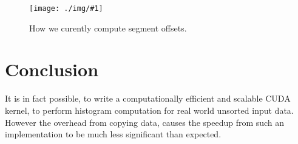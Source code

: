 \documentclass[12pt, a4paper, hidelinks]{article}
\newcommand{\fig}[3]{
\begin{figure}[h]
  \begin{center}
    \texttt{[image: ./img/\#1]}
  \end{center}
  \caption{#3}
  \label{fig:#1}
\end{figure}
}
\begin{document}
\fig{seg-offsets}{140}{How we curently compute segment offsets.}


\section{Conclusion}
It is in fact possible, to write a computationally efficient and scalable CUDA kernel,
to perform histogram computation for real world unsorted input data.
However the overhead from copying data,
causes the speedup from such an implementation to be much less significant than expected.



\end{document}
